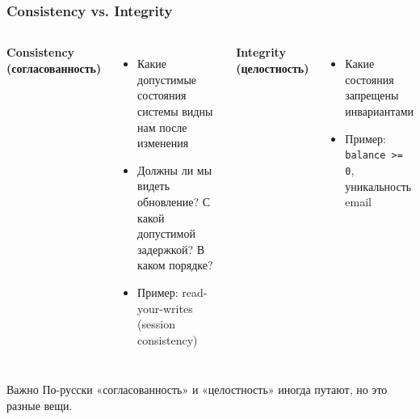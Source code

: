 \documentclass{beamer}
\begin{document}
\begin{frame}
\frametitle{Consistency vs. Integrity}

\begin{columns}
\textbf{Consistency (согласованность)}
\begin{itemize}
  \item Какие допустимые состояния системы видны нам после изменения
  \item Должны ли мы видеть обновление? С какой допустимой задержкой? В каком порядке?
  \item Пример: read-your-writes (session consistency)
\end{itemize}

\textbf{Integrity (целостность)}
\begin{itemize}
  \item Какие состояния запрещены инвариантами
  \item Пример: \texttt{balance >= 0}, уникальность email
\end{itemize}
\end{columns}

\vspace{0.3cm}
\begin{alertblock}{Важно}
По-русски «согласованность» и «целостность» иногда путают, но это разные вещи.
\end{alertblock}

\end{frame}
\end{document}
